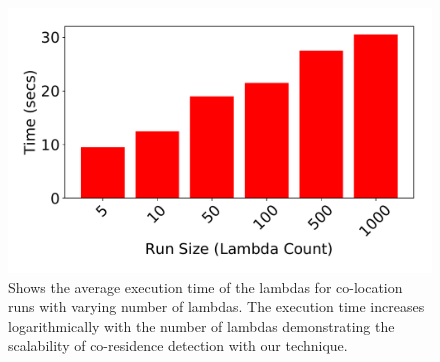 \begin{figure}[!t]
  \includegraphics[width=.99\linewidth]{fig/runtimes.pdf}
  \caption{Shows the average execution time of the lambdas for co-location runs with varying 
  number of lambdas. The execution time increases logarithmically with the number of lambdas 
  demonstrating the scalability of co-residence detection with our technique.
\label{fig:runtimes}}
\end{figure}



